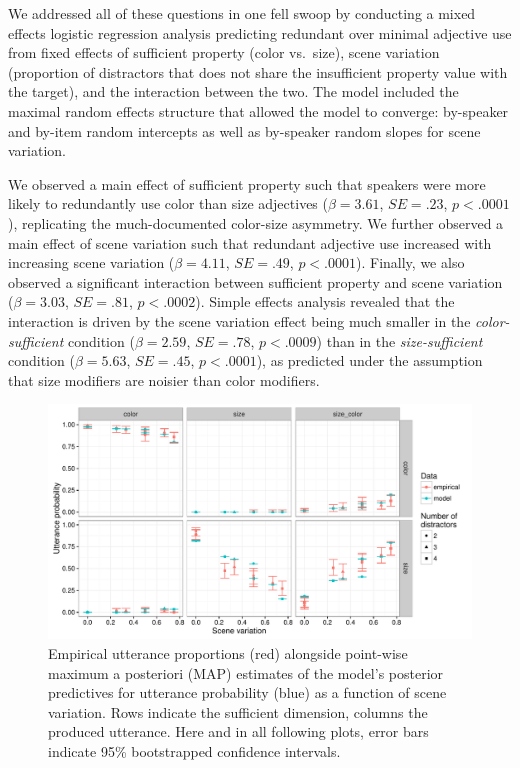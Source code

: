 \documentclass[11pt]{article}
\begin{document}
We addressed all of these questions in one fell swoop by conducting a mixed effects logistic regression analysis predicting redundant over minimal adjective use from fixed effects of sufficient property (color vs.~size), scene variation (proportion of distractors that does not share the insufficient property value with the target), and the interaction between the two. The model included the maximal random effects structure that allowed the model to converge: by-speaker and by-item random intercepts as well as by-speaker random slopes for scene variation. 

We observed a main effect of sufficient property such that speakers were more likely to redundantly use color than size adjectives ($\beta = 3.61$, $SE = .23$, $p < .0001$), replicating the much-documented color-size asymmetry. We further observed a main effect of scene variation such that redundant adjective use increased with increasing scene variation ($\beta = 4.11$, $SE = .49$, $p < .0001$). Finally, we also observed a significant interaction between sufficient property and scene variation ($\beta = 3.03$, $SE = .81$, $p < .0002$). Simple effects analysis revealed that the interaction is driven by the scene variation effect being much smaller in the \emph{color-sufficient} condition ($\beta = 2.59$, $SE = .78$, $p < .0009$) than in the \emph{size-sufficient} condition ($\beta = 5.63$, $SE = .45$, $p < .0001$), as predicted under the assumption that size modifiers are noisier than color modifiers.



\begin{figure}
\centering
\includegraphics[width=\textwidth]{../../../models/1_basic_overinformativeness/results_bda/graphs/scenevariation-fixed-reducedconditions}
\caption{Empirical utterance proportions  (red)  alongside point-wise maximum a posteriori (MAP) estimates of the model's posterior predictives for utterance probability (blue) as a function of scene variation. Rows indicate the sufficient dimension, columns the produced utterance. Here and in all following plots, error bars indicate 95\% bootstrapped confidence intervals.}
\label{fig:exp1results}
\end{figure}
\end{document}
